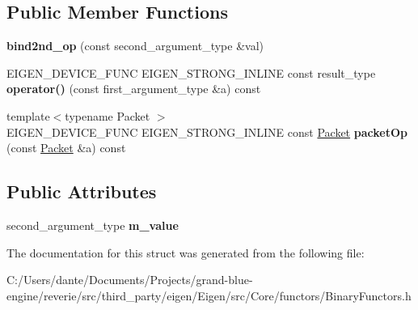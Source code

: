 \subsection*{Public Member Functions}
\begin{DoxyCompactItemize}
\item 
\mbox{\label{struct_eigen_1_1internal_1_1bind2nd__op_a62bc1a63faa8acd350cd47e58ee1db18}} 
{\bfseries bind2nd\+\_\+op} (const second\+\_\+argument\+\_\+type \&val)
\item 
\mbox{\label{struct_eigen_1_1internal_1_1bind2nd__op_a5bbc5ea88b92dc44ac50c4661211138c}} 
E\+I\+G\+E\+N\+\_\+\+D\+E\+V\+I\+C\+E\+\_\+\+F\+U\+NC E\+I\+G\+E\+N\+\_\+\+S\+T\+R\+O\+N\+G\+\_\+\+I\+N\+L\+I\+NE const result\+\_\+type {\bfseries operator()} (const first\+\_\+argument\+\_\+type \&a) const
\item 
\mbox{\label{struct_eigen_1_1internal_1_1bind2nd__op_a24c0369009febc49bebf4b1caa046206}} 
{\footnotesize template$<$typename Packet $>$ }\\E\+I\+G\+E\+N\+\_\+\+D\+E\+V\+I\+C\+E\+\_\+\+F\+U\+NC E\+I\+G\+E\+N\+\_\+\+S\+T\+R\+O\+N\+G\+\_\+\+I\+N\+L\+I\+NE const \mbox{\hyperlink{union_eigen_1_1internal_1_1_packet}{Packet}} {\bfseries packet\+Op} (const \mbox{\hyperlink{union_eigen_1_1internal_1_1_packet}{Packet}} \&a) const
\end{DoxyCompactItemize}
\subsection*{Public Attributes}
\begin{DoxyCompactItemize}
\item 
\mbox{\label{struct_eigen_1_1internal_1_1bind2nd__op_a816ed96eec76ba3ccb8d3e71f62776ee}} 
second\+\_\+argument\+\_\+type {\bfseries m\+\_\+value}
\end{DoxyCompactItemize}


The documentation for this struct was generated from the following file\+:\begin{DoxyCompactItemize}
\item 
C\+:/\+Users/dante/\+Documents/\+Projects/grand-\/blue-\/engine/reverie/src/third\+\_\+party/eigen/\+Eigen/src/\+Core/functors/Binary\+Functors.\+h\end{DoxyCompactItemize}
